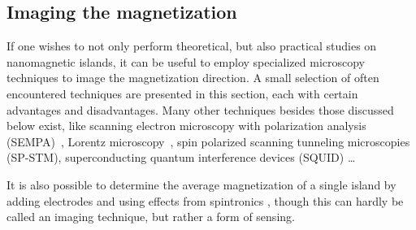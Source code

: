 \documentclass[11pt,a4paper,english]{article}
\begin{document}
\FloatBarrier
\subsection{Imaging the magnetization}
If one wishes to not only perform theoretical, but also practical studies on nanomagnetic islands, it can be useful to employ specialized microscopy techniques to image the magnetization direction. A small selection of often encountered techniques are presented in this section, each with certain advantages and disadvantages. Many other techniques besides those discussed below exist, like scanning electron microscopy with polarization analysis (SEMPA)~\cite{Imaging_SEMPA}, Lorentz microscopy~\cite{Imaging_Lorentz}, spin polarized scanning tunneling microscopies (SP-STM), superconducting quantum interference devices (SQUID) \dots \par
It is also possible to determine the average magnetization of a single island by adding electrodes and using effects from spintronics
, though this can hardly be called an imaging technique, but rather a form of sensing.
\end{document}
